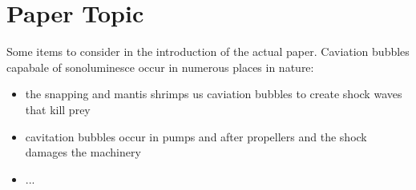 \documentclass[prb,aps,12pt,superscriptaddress,floatfix]{revtex4-2}
\begin{document}
\section{Paper Topic}

Some items to consider in the introduction of the actual paper. Caviation bubbles capabale of sonoluminesce occur in numerous places in nature:
\begin{itemize}
    \item the snapping and mantis shrimps us caviation bubbles to create shock waves that kill prey
    \item cavitation bubbles occur in pumps and after propellers and the shock damages the machinery
    \item ...
\end{itemize}






\end{document}
